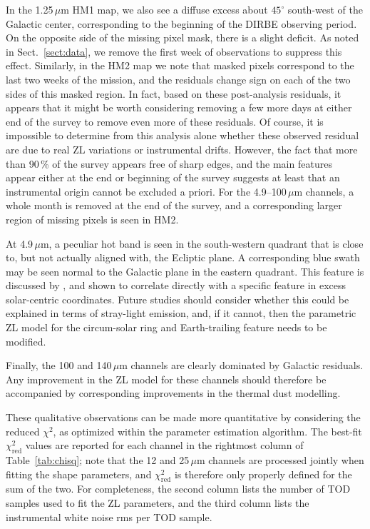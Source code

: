 \documentclass[twocolumn]{aa}
\begin{document}
In the 1.25\,$\mu$m HM1 map, we also see a diffuse excess about
$45^{\circ}$ south-west of the Galactic center, corresponding to the
beginning of the DIRBE observing period. On the opposite side of the
missing pixel mask, there is a slight deficit. As noted in
Sect.~\ref{sect:data}, we remove the first week of observations to
suppress this effect. Similarly, in the HM2 map we note that masked
pixels correspond to the last two weeks of the mission, and the
residuals change sign on each of the two sides of this masked
region. In fact, based on these post-analysis residuals, it appears
that it might be worth considering removing a few more days at either
end of the survey to remove even more of these residuals. Of course,
it is impossible to determine from this analysis alone whether these
observed residual are due to real ZL variations or instrumental
drifts. However, the fact that more than 90\,\% of the survey appears
free of sharp edges, and the main features appear either at the end or
beginning of the survey suggests at least that an instrumental origin
cannot be excluded a priori. For the 4.9--100$\,\mu$m channels, a
whole month is removed at the end of the survey, and a corresponding
larger region of missing pixels is seen in HM2.

At 4.9\,$\mu$m, a peculiar hot band is seen in the south-western
quadrant that is close to, but not actually aligned with, the Ecliptic
plane. A corresponding blue swath may be seen normal to the Galactic
plane in the eastern quadrant. This feature is discussed by
\citet{CG02_01}, and shown to correlate directly with a specific
feature in excess solar-centric coordinates. Future studies should
consider whether this could be explained in terms of stray-light
emission, and, if it cannot, then the parametric ZL model for the
circum-solar ring and Earth-trailing feature needs to be modified.

Finally, the 100 and 140$\,\mu$m channels are clearly dominated by
Galactic residuals. Any improvement in the ZL model for these
channels should therefore be accompanied by corresponding
improvements in the thermal dust modelling.


These qualitative observations can be made more quantitative by
considering the reduced $\chi^2$, as optimized within the parameter
estimation algorithm. The best-fit $\chi^2_{\mathrm{red}}$ values are
reported for each channel in the rightmost column of
Table~\ref{tab:chisq}; note that the 12 and 25$\,\mu$m channels are
processed jointly when fitting the shape parameters, and
$\chi^2_{\mathrm{red}}$ is therefore only properly defined for the sum
of the two. For completeness, the second column lists the number of
TOD samples used to fit the ZL parameters, and the third column lists
the instrumental white noise rms per TOD sample.
\end{document}
